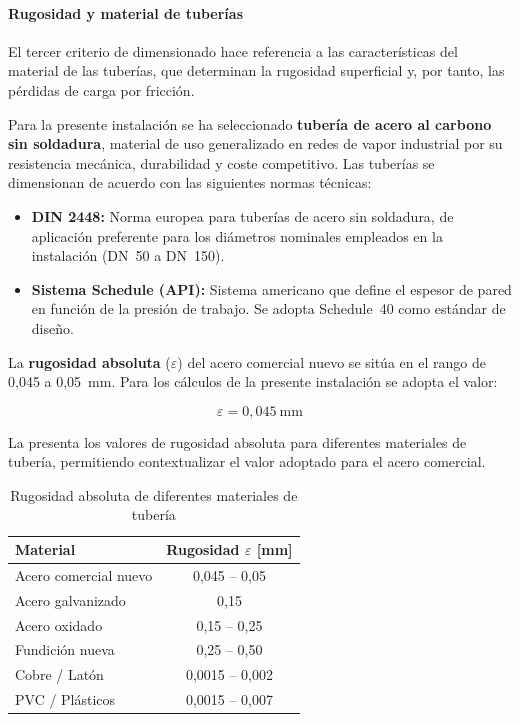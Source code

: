 \paragraph{Rugosidad y material de tuberías}

El tercer criterio de dimensionado hace referencia a las características del material de las tuberías, que determinan la rugosidad superficial y, por tanto, las pérdidas de carga por fricción.

Para la presente instalación se ha seleccionado \textbf{tubería de acero al carbono sin soldadura}, material de uso generalizado en redes de vapor industrial por su resistencia mecánica, durabilidad y coste competitivo. Las tuberías se dimensionan de acuerdo con las siguientes normas técnicas:

\begin{itemize}[leftmargin=2em]
	\item \textbf{DIN 2448:} Norma europea para tuberías de acero sin soldadura, de aplicación preferente para los diámetros nominales empleados en la instalación (DN~50 a DN~150).
	\item \textbf{Sistema Schedule (API):} Sistema americano que define el espesor de pared en función de la presión de trabajo. Se adopta Schedule~40 como estándar de diseño.
\end{itemize}

La \textbf{rugosidad absoluta} ($\varepsilon$) del acero comercial nuevo se sitúa en el rango de 0,045 a 0,05~mm. Para los cálculos de la presente instalación se adopta el valor:

\begin{equation}
	\varepsilon = 0{,}045 \ \text{mm}
	\label{eq:rugosidad-acero}
\end{equation}

La  presenta los valores de rugosidad absoluta para diferentes materiales de tubería, permitiendo contextualizar el valor adoptado para el acero comercial.

\begin{table}[H]
	\centering
	\caption{Rugosidad absoluta de diferentes materiales de tubería}
	\label{tab:rugosidades-materiales}
	\begin{tabular}{lc}
		\toprule
		\textbf{Material}     & \textbf{Rugosidad $\varepsilon$ [mm]} \\
		\midrule
		Acero comercial nuevo & 0,045 -- 0,05                         \\
		Acero galvanizado     & 0,15                                  \\
		Acero oxidado         & 0,15 -- 0,25                          \\
		Fundición nueva       & 0,25 -- 0,50                          \\
		Cobre / Latón         & 0,0015 -- 0,002                       \\
		PVC / Plásticos       & 0,0015 -- 0,007                       \\
		\bottomrule
	\end{tabular}
\end{table}

